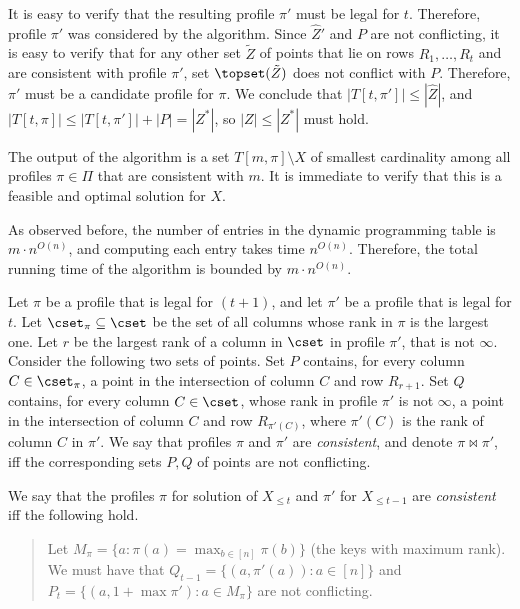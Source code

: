 \documentclass{toc}
\begin{document}
It is easy to verify that the resulting profile $\pi'$ must be legal for $t$. Therefore, profile $\pi'$ was considered by the algorithm. 
Since $\hat Z'$ and $P$ are not conflicting, it is easy to verify that for any other set $\tilde Z$ of points that lie on rows $R_1,\ldots,R_t$ and are consistent with profile $\pi'$, set $\topset(\tilde Z)$ does not conflict with $P$. Therefore, $\pi'$ must be a candidate profile for $\pi$. We conclude that $|T[t,\pi']|\leq |\hat Z|$, and  $|T[t,\pi]|\leq |T[t,\pi']|+|P|=|Z^*|$, so $|Z|\leq |Z^*|$ must hold.

The output of the algorithm is a set $T[m,\pi]\setminus X$ of smallest cardinality among all profiles $\pi\in \Pi$ that are consistent with $m$. It is immediate to verify that this is a feasible and optimal solution for $X$.

As observed before, the number of entries in the dynamic programming table is $m\cdot n^{O(n)}$, and computing each entry takes time $n^{O(n)}$. Therefore, the total running time of the algorithm is bounded by $m\cdot n^{O(n)}$.



\iffalse

%

Let $\pi$ be a profile that is legal for $(t+1)$, and let $\pi'$ be a profile that is legal for $t$. 
Let $\cset_{\pi}\subseteq \cset$ be the set of all columns whose rank in $\pi$ is the largest one.
Let $r$ be the largest rank of a column in $\cset$ in profile $\pi'$, that is not $\infty$.
Consider the following two sets of points. Set $P$ contains, for every column $C\in \cset_{\pi}$, a point in the intersection of column $C$ and row $R_{r+1}$. Set $Q$ contains, for every column $C\in \cset$, whose rank in profile $\pi'$ is not $\infty$, a point in the intersection of column $C$ and row $R_{\pi'(C)}$, where $\pi'(C)$ is the rank of column $C$ in $\pi'$. 
We say that profiles $\pi$ and $\pi'$ are \emph{consistent}, and denote $\pi \bowtie \pi'$, iff the corresponding sets $P,Q$ of points are not conflicting.




%
We say that the profiles $\pi$ for solution of $X_{\leq t}$ and $\pi'$ for $X_{\leq t-1}$ are \emph{consistent} iff the following hold.  



\begin{quote}
Let $M_{\pi} = \{a: \pi(a) = \max_{ b \in [n]} \pi(b)\}$ (the keys with maximum rank). 
We must have that $Q_{t-1}= \{(a, \pi'(a)): a \in [n]\}$ and $P_t= \{(a, 1+\max \pi'): a \in M_{\pi}\}$ are not conflicting. 
%
\end{quote}
\end{document}
